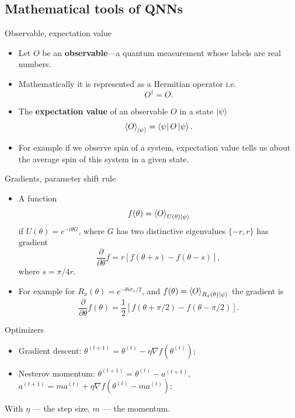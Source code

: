 \subsection{Mathematical tools of QNNs}
\begin{frame}{Observable, expectation value}
	\begin{itemize}
		\item Let $O$ be an \textbf{observable}---a quantum measurement whose labels
		are real numbers. 
		\item Mathematically it is represented as a Hermitian operator i.e.
		$$O^\dagger = O.$$ 
		\item The \textbf{expectation value} of an observable $O$ in
		a state $\ket{\psi}$ 
		$$\expval{O}_{\ket{\psi}} = \bra{\psi}O\ket{\psi}.$$
		\item For example if we observe spin of a system, expectation value
		tells us about the average spin of this system in a given state.
	\end{itemize}
\end{frame}
\begin{frame}{Gradients, parameter shift rule}
	\begin{itemize}
		\item A function
		$$f(\theta) = \expval{O}_{U(\theta)\ket{\psi}}$$ if $U(\theta)=e^{-i \theta G}$, where
		$G$ has two distinctive eigenvalues $\{-r,r\}$ has gradient
		$$\frac{\partial}{\partial \theta}f = r\left[f(\theta+s)-f(\theta-s)\right],$$
		where $s=\pi/4r$.
		\item For example for $R_x(\theta)= e^{-\theta i\sigma_x/2}$, and
		$f(\theta)=\expval{O}_{R_x(\theta)\ket{\psi}}$ the gradient is
		$$\frac{\partial}{\partial \theta}f(\theta) = \frac{1}{2}\left[f(\theta+\pi/2) - f(\theta-\pi/2)\right].$$	
	\end{itemize}
\end{frame}
\begin{frame}{Optimizers}
	\begin{itemize}
		\item Gradient descent: $\theta^{(t+1)} = \theta^{(t)} - \eta \nabla f(\theta^{(t)});$
		\item Nesterov momentum:
		$\theta^{(t+1)} = \theta^{(t)} - a^{(t+1)},$\\
		$a^{(t+1)} = m a^{(t)} + \eta \nabla f(\theta^{(t)} - m a^{(t)});$
	\end{itemize}
	With $\eta$ --- the step size, $m$ --- the momentum.
\end{frame}
